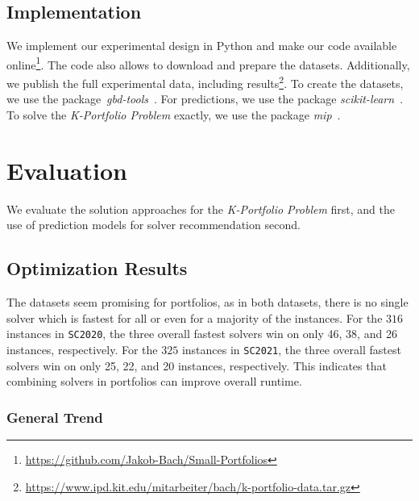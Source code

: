 \documentclass[runningheads]{llncs}
\begin{document}
\subsection{Implementation}
\label{sec:experimental-design:impl}

We implement our experimental design in Python and make our code available online\footnote{\url{https://github.com/Jakob-Bach/Small-Portfolios}}.
The code also allows to download and prepare the datasets.
Additionally, we publish the full experimental data, including results\footnote{\url{https://www.ipd.kit.edu/mitarbeiter/bach/k-portfolio-data.tar.gz}}.
To create the datasets, we use the package~\emph{gbd-tools}~\cite{iser2020collaborative}.
For predictions, we use the package \emph{scikit-learn}~\cite{scikit-learn}.
To solve the \emph{K-Portfolio Problem} exactly, we use the package \emph{mip}~\cite{python-mip}.

\section{Evaluation}
\label{sec:evaluation}

We evaluate the solution approaches for the \emph{K-Portfolio Problem} first, and the use of prediction models for solver recommendation second.

\subsection{Optimization Results}

The datasets seem promising for portfolios, as in both datasets, there is no single solver which is fastest for all or even for a majority of the instances.
For the $316$ instances in \texttt{SC2020}, the three overall fastest solvers win on only 46, 38, and 26 instances, respectively.
For the $325$ instances in \texttt{SC2021}, the three overall fastest solvers win on only 25, 22, and 20 instances, respectively.
This indicates that combining solvers in portfolios can improve overall runtime.

\subsubsection{General Trend}
\end{document}
